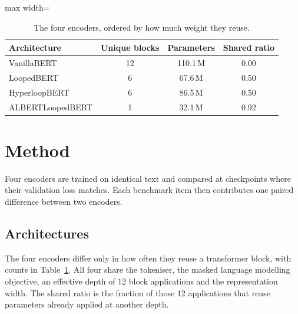 \documentclass[sigconf,natbib=true]{acmart}
\begin{document}
\begin{table}[!htb]
\centering
\caption{The four encoders, ordered by how much weight they reuse.}
\label{tab:arch}
\small
\begin{adjustbox}{max width=\columnwidth}
\begin{tabular}{lccc}
\toprule
Architecture & Unique blocks & Parameters & Shared ratio \\
\midrule
VanillaBERT \citep{devlin2019bert}          & 12 & 110.1\,M & 0.00 \\
LoopedBERT \citep{saunshi2025looped}        &  6 &  67.6\,M & 0.50 \\
HyperloopBERT \citep{zeitoun2026hyperloop}  &  6 &  86.5\,M & 0.50 \\
ALBERTLoopedBERT \citep{lan2020albert}      &  1 &  32.1\,M & 0.92 \\
\bottomrule
\end{tabular}
\end{adjustbox}
\end{table}

\section{Method}
\label{sec:method}

Four encoders are trained on identical text and compared at checkpoints where
their validation loss matches. Each benchmark item then contributes one paired
difference between two encoders.

\subsection{Architectures}

The four encoders differ only in how often they reuse a transformer block, with
counts in Table~\ref{tab:arch}. All four share the tokeniser, the masked language
modelling objective, an effective depth of 12 block applications and the
representation width. The shared ratio is the fraction of those 12 applications
that reuse parameters already applied at another depth.
\end{document}

